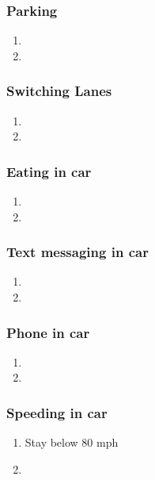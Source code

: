 \begin{frame}
\frametitle{Parking}

\begin{enumerate}
\item \small
\item \small
\end{enumerate}

\end{frame}


\begin{frame}
\frametitle{Switching Lanes }

\begin{enumerate}
\item \small
\item \small
\end{enumerate}

\end{frame}



\begin{frame}
\frametitle{Eating in car}

\begin{enumerate}
\item \small
\item \small
\end{enumerate}

\end{frame}


\begin{frame}
\frametitle{Text messaging in car}

\begin{enumerate}
\item \small
\item \small
\end{enumerate}

\end{frame}


\begin{frame}
\frametitle{Phone in car}

\begin{enumerate}
\item \small
\item \small
\end{enumerate}

\end{frame}



\begin{frame}
\frametitle{Speeding in car}

\begin{enumerate}
\item \small  Stay below 80 mph
\item \small
\end{enumerate}
\end{frame}

